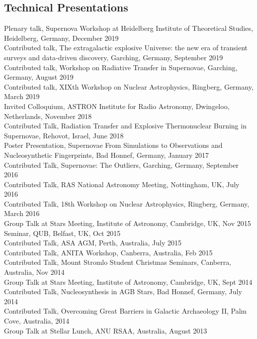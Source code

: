 \documentclass[11pt]{res} %
\begin{document}
\begin{resume}
\section{Technical Presentations}
  Plenary talk, Supernova Workshop at Heidelberg Institute of Theoretical Studies, Heidelberg, Germany, December 2019\\
  Contributed talk, The extragalactic explosive Universe: the new era of transient surveys and data-driven discovery, Garching, Germany, September 2019\\
  Contributed talk, Workshop on Radiative Transfer in Supernovae, Garching, Germany, August 2019\\
  Contributed talk, XIXth Workshop on Nuclear Astrophysics, Ringberg, Germany, March 2019\\
  Invited Colloquium, ASTRON Institute for Radio Astronomy, Dwingeloo, Netherlands, November 2018\\
  Contributed Talk, Radiation Transfer and Explosive Thermonuclear Burning in Supernovae, Rehovot, Israel, June 2018\\
  Poster Presentation, Supernovae From Simulations to Observations and Nucleosynthetic Fingerprints, Bad Honnef, Germany, January 2017\\
  Contributed Talk, Supernovae: The Outliers, Garching, Germany, September 2016\\
  Contributed Talk, RAS National Astronomy Meeting, Nottingham, UK, July 2016\\
  Contributed Talk, 18th Workshop on Nuclear Astrophysics, Ringberg, Germany, March 2016\\
  Group Talk at Stars Meeting, Institute of Astronomy, Cambridge, UK, Nov 2015\\
  Seminar, QUB, Belfast, UK, Oct 2015\\
  Contributed Talk, ASA AGM, Perth, Australia, July 2015\\
  Contributed Talk, ANITA Workshop, Canberra, Australia, Feb 2015\\
  Contributed Talk, Mount Stromlo Student Christmas Seminars, Canberra, Australia, Nov 2014\\
  Group Talk at Stars Meeting, Institute of Astronomy, Cambridge, UK, Sept 2014\\
  Contributed Talk, Nucleosynthesis in AGB Stars, Bad Honnef, Germany, July 2014\\
  Contributed Talk, Overcoming Great Barriers in Galactic Archaeology II, Palm Cove, Australia, 2014\\
  Group Talk at Stellar Lunch, ANU RSAA, Australia, August 2013\\


\end{resume}
\end{document}
